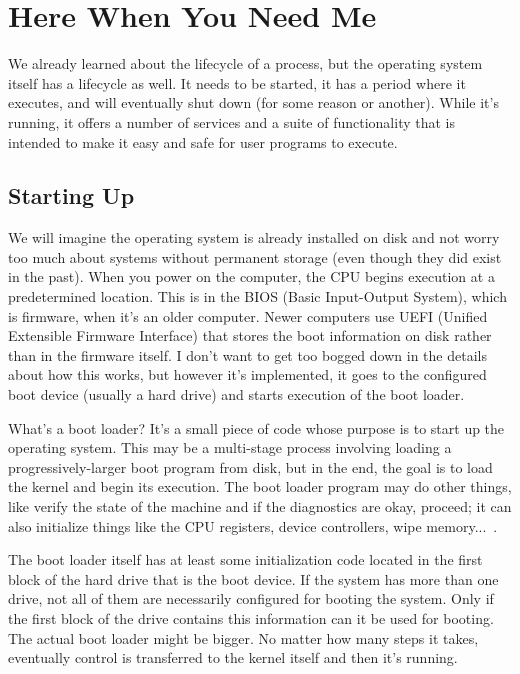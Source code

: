 




\section*{Here When You Need Me}

We already learned about the lifecycle of a process, but the operating system itself has a lifecycle as well. It needs to be started, it has a period where it executes, and will eventually shut down (for some reason or another). While it's running, it offers a number of services and a suite of functionality that is intended to make it easy and safe for user programs to execute.

\subsection*{Starting Up}
We will imagine the operating system is already installed on disk and not worry too much about systems without permanent storage (even though they did exist in the past). When you power on the computer, the CPU begins execution at a predetermined location. This is in the BIOS (Basic Input-Output System), which is firmware, when it's an older computer. Newer computers use  UEFI (Unified Extensible Firmware Interface) that stores the boot information on disk rather than in the firmware itself. I don't want to get too bogged down in the details about how this works, but however it's implemented, it goes to the configured boot device (usually a hard drive)  and starts execution of the boot loader. 

What's a boot loader? It's a small piece of code whose purpose is to start up the operating system. This may be a multi-stage process involving loading a progressively-larger boot program from disk, but in the end, the goal is to load the kernel and begin its execution. The boot loader program may do other things, like verify the state of the machine and if the diagnostics are okay, proceed; it can also initialize things like the CPU registers, device controllers, wipe memory...~\cite{osc}.

The boot loader itself has at least some initialization code located in the first block of the hard drive that is the boot device. If the system has more than one drive, not all of them are necessarily configured for booting the system. Only if the first block of the drive contains this information can it be used for booting. The actual boot loader might be bigger. No matter how many steps it takes, eventually control is transferred to the kernel itself and then it's running. 


